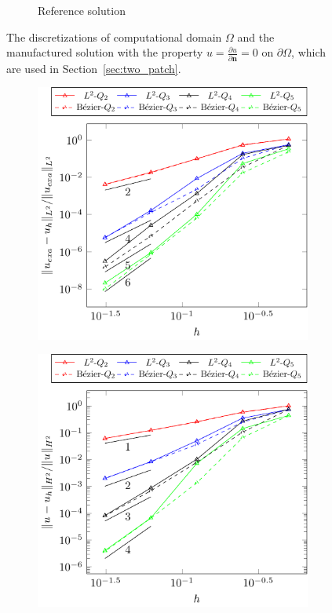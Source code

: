 \documentclass[preprint,12pt]{elsarticle}
\theoremstyle{remark}
\begin{document}
\begin{figure}[hbt]
\begin{subfigure}[b]{0.47\textwidth}
        \caption{Reference solution}\label{fig:two_patch_biharmonic_problem_solution-plot}
    \end{subfigure}
	\caption{The discretizations of computational domain $\Omega$ and the manufactured solution with the property $u=\frac{\partial{u}}{\partial{\mathbf{n}}}=0$ on $\partial{\Omega}$, which are used in Section~\ref{sec:two_patch}.}\label{fig:two_patch_biharmonic_problem}
\end{figure}

\begin{figure}[hbt]
    \centering
    \begin{subfigure}[b]{0.48\textwidth}
        \includegraphics[width=\textwidth]{two_patch_biharmonic_basic}
    \end{subfigure}
    \begin{subfigure}[b]{0.48\textwidth}
        \includegraphics[width=\textwidth]{two_patch_biharmonic_basic_H2}

\end{subfigure}
\end{figure}
\end{document}
